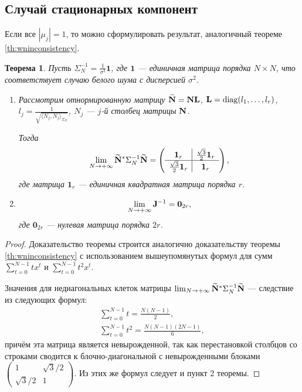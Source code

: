 \documentclass[12pt,a4paper]{article}
\def\diag{\mathop{\mathrm{diag}}}
\newtheorem{theorem}{Теорема}
\begin{document}
\subsection{Случай стационарных компонент}
Если все $|\mu_j| = 1$, то можно сформулировать результат, аналогичный теореме \ref{th:wninconsistency}.

\begin{theorem}\label{th:freqconsistency}
Пусть $\Sigma_N^{-1} = \frac{1}{\sigma^2}{\mathbf{1}}$, где $\mathbf{1}$ --- единичная матрица порядка $N \times N$, что соответствует случаю белого шума с дисперсией $\sigma^2$.

\begin{enumerate}
	\item Рассмотрим отнормированную матрицу $\widetilde {\mathbf{N}} = \mathbf{N} \mathbf{L}$, $\bfL = \diag(l_1, \ldots, l_r)$, 
	$l_j =\frac{1}{\sqrt{\langle N_j, N_j \rangle_{\Sigma_N}}}$, $N_j$ --- $j$-й столбец матрицы $\mathbf{N}$.
	
	Тогда \begin{equation*}
	\lim_{N \to + \infty} \widetilde {\mathbf{N}}^* \Sigma_N^{-1} \widetilde {\mathbf{N}} = \left( \begin{array}{c|c}
	\mathbf{1}_r & \frac{\sqrt{3}}{2} \mathbf{1}_r  \\ \hline
	\frac{\sqrt{3}}{2} \mathbf{1}_r & \mathbf{1}_r
	\end{array}  \right),
	\end{equation*}
	где матрица $\mathbf{1}_{r}$ --- единичная квадратная матрица порядка $r$.
	
	\item 
	\begin{equation*}
	\lim_{N \to + \infty} \mathbf{J}^{-1} = \mathbf{0}_{2r},
	\end{equation*}
	где $\mathbf{0}_{2r}$ --- нулевая матрица порядка $2r$.
\end{enumerate}
\end{theorem}
\begin{proof}
	Доказательство теоремы строится аналогично доказательству теоремы \ref{th:wninconsistency} с использованием вышеупомянутых формул для сумм $\sum_{t=0}^{N-1} t x^t$ и $\sum_{t=0}^{N-1} t^2 x^t$.
	
	Значения для недиагональных клеток матрицы $\lim_{N \to + \infty} \widetilde {\mathbf{N}}^* \Sigma_N^{-1} \widetilde {\mathbf{N}}$ --- следствие из следующих формул:
	\begin{gather*}
	\sum_{t=0}^{N-1} t = \frac{N(N-1)}{2}, \\
	\sum_{t=0}^{N-1} t^2 = \frac{N(N-1)(2N-1)}{6},
	\end{gather*}
	причём эта матрица является невырожденной, так как перестановкой столбцов со строками сводится к блочно-диагональной с невырожденными блоками $\left( \begin{array}{c|c}
	1 & \sqrt{3}/2  \\ \hline
	\sqrt{3} / 2 & 1
	\end{array}  \right)$.
	Из этих же формул следует и пункт 2 теоремы.
\end{proof}
\end{document}
